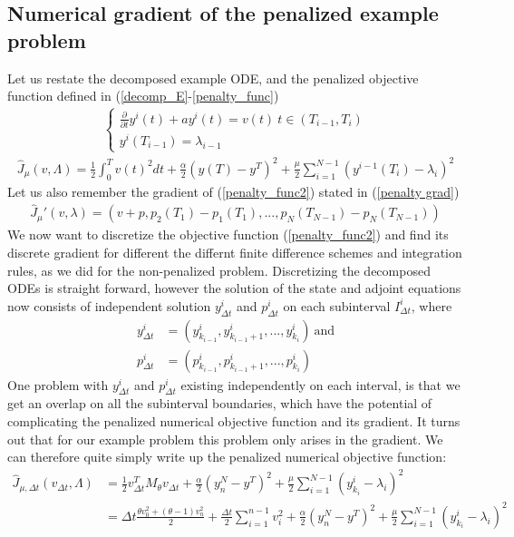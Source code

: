 \subsection{Numerical gradient of the penalized example problem}
Let us restate the decomposed example ODE, and the penalized objective function defined in (\ref{decomp_E}-\ref{penalty_func})
\begin{align}
\left\{
     \begin{array}{lr}
       	\frac{\partial}{\partial t} y^i(t)+a y^i(t) = v(t) \ t\in(T_{i-1},T_{i})\\
       	y^i(T_{i-1})=\lambda_{i-1}
     \end{array}
   \right. \label{decomp_E2}
\end{align}
\begin{align}
\hat J_{\mu}(v,\Lambda) = \frac{1}{2}\int_0^Tv(t)^2dt + \frac{\alpha}{2}(y(T)-y^T)^2 + \frac{\mu}{2}\sum_{i=1}^{N-1}(y^{i-1}(T_i)-\lambda_i)^2 \label{penalty_func2}
\end{align}
Let us also remember the gradient of (\ref{penalty_func2}) stated in (\ref{penalty grad})
\begin{align}
\hat J_{\mu}'(v,\lambda) = (v+p,p_{2}(T_1) -p_{1}(T_1),..., p_{N}(T_{N-1}) -p_{N}(T_{N-1})) \label{penalty grad2}
\end{align}
We now want to discretize the objective function (\ref{penalty_func2}) and find its discrete gradient for different the differnt finite difference schemes and integration rules, as we did for the non-penalized problem. Discretizing the decomposed ODEs is straight forward, however the solution of the state and adjoint equations now consists of independent solution $y_{\Delta t}^i$ and $p_{\Delta t}^i$ on each subinterval $I_{\Delta t}^i$, where 
\begin{align*}
y_{\Delta t}^i &= (y_{k_{i-1}}^i,y_{k_{i-1}+1}^i,...,y_{k_{i}}^i) \ \text{and} \\
p_{\Delta t}^i &= (p_{k_{i-1}}^i,p_{k_{i-1}+1}^i,...,p_{k_{i}}^i)
\end{align*} 
One problem with $y_{\Delta t}^i$ and $p_{\Delta t}^i$ existing independently on each interval, is that we get an overlap on all the subinterval boundaries, which have the potential of complicating the penalized numerical objective function and its gradient. It turns out that for our example problem this problem only arises in the gradient. We can therefore quite simply write up the penalized numerical objective function:
\begin{align}
\hat J_{\mu,\Delta t}(v_{\Delta t},\Lambda)&=\frac{1}{2} v_{\Delta t}^TM_{\theta}v_{\Delta t}+ \frac{\alpha}{2}(y_n^{N}-y^T)^2 +\frac{\mu }{2}\sum_{i=1}^{N-1} (y_{k_i}^{i}-\lambda_i)^2\\
&=\Delta t\frac{\theta v_0^2+(\theta-1)v_n^2}{2} + \frac{\Delta t}{2}\sum_{i=1}^{n-1} v_i^2 + \frac{\alpha}{2}(y_n^N-y^T)^2+\frac{\mu }{2}\sum_{i=1}^{N-1} (y_{k_i}^{i}-\lambda_i)^2 \label{pen disc f}
\end{align}
